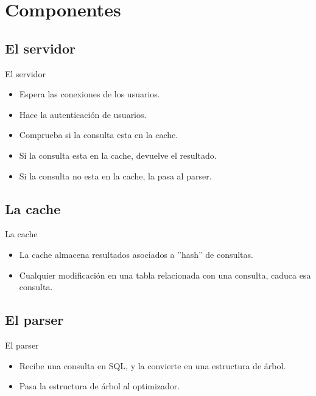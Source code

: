 \section{Componentes}
\subsection{El servidor}
\begin{frame}{El servidor}
  \begin{itemize}
    \item Espera las conexiones de los usuarios.
    \item Hace la autenticación de usuarios.
    \item Comprueba si la consulta esta en la cache.
    \item Si la consulta esta en la cache, devuelve el resultado.
    \item Si la consulta no esta en la cache, la pasa al parser.
  \end{itemize}
\end{frame}

\subsection{La cache}
\begin{frame}{La cache}
  \begin{itemize}
    \item La cache almacena resultados asociados a ''hash'' de consultas.
    \item Cualquier modificación en una tabla relacionada con una consulta, caduca esa consulta.
  \end{itemize}
\end{frame}

\subsection{El parser}
\begin{frame}{El parser}
  \begin{itemize}
    \item Recibe una consulta en SQL, y la convierte en una estructura de árbol.
    \item Pasa la estructura de árbol al optimizador.
  \end{itemize}
\end{frame}

